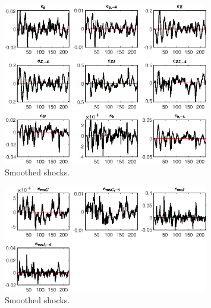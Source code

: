  
\begin{figure}[H]
\centering 
\includegraphics[width=0.80\textwidth]{BRS_sectoral_wo_gmf/graphs/BRS_sectoral_wo_gmf_SmoothedShocks1}
\caption{Smoothed shocks.}\label{Fig:SmoothedShocks:1}
\end{figure}

\begin{figure}[H]
\centering 
\includegraphics[width=0.80\textwidth]{BRS_sectoral_wo_gmf/graphs/BRS_sectoral_wo_gmf_SmoothedShocks2}
\caption{Smoothed shocks.}\label{Fig:SmoothedShocks:2}
\end{figure}


